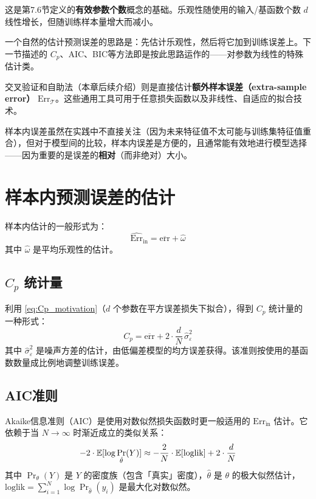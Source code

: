 这是第7.6节定义的\textbf{有效参数个数}概念的基础。乐观性随使用的输入/基函数个数 $d$ 线性增长，但随训练样本量增大而减小。

\begin{remark}
    一个自然的估计预测误差的思路是：先估计乐观性，然后将它加到训练误差上。下一节描述的 $C_p$、AIC、BIC等方法即是按此思路运作的——对参数为线性的特殊估计类。
\end{remark}

\begin{remark}
    交叉验证和自助法（本章后续介绍）则是直接估计\textbf{额外样本误差（extra-sample error）} $\mathrm{Err}_{\mathcal{T}}$。这些通用工具可用于任意损失函数以及非线性、自适应的拟合技术。
\end{remark}

样本内误差虽然在实践中不直接关注（因为未来特征值不太可能与训练集特征值重合），但对于模型间的比较，样本内误差是方便的，且通常能有效地进行模型选择——因为重要的是误差的\textbf{相对}（而非绝对）大小。

\section{样本内预测误差的估计}

样本内估计的一般形式为：
\begin{equation}\label{eq:Err_in_hat}
    \widehat{\mathrm{Err}}_{\text{in}} = \overline{\mathrm{err}} + \hat{\omega}
\end{equation}
其中 $\hat{\omega}$ 是平均乐观性的估计。

\subsection{$C_p$ 统计量}

利用 \eqref{eq:Cp_motivation}（$d$ 个参数在平方误差损失下拟合），得到 $C_p$ 统计量的一种形式：
\begin{equation}\label{eq:Cp}
    C_p = \overline{\mathrm{err}} + 2\cdot\frac{d}{N}\,\hat{\sigma}_\varepsilon^2
\end{equation}
其中 $\hat{\sigma}_\varepsilon^2$ 是噪声方差的估计，由低偏差模型的均方误差获得。该准则按使用的基函数数量成比例地调整训练误差。

\subsection{AIC准则}

Akaike信息准则（AIC）是使用对数似然损失函数时更一般适用的 $\mathrm{Err}_{\text{in}}$ 估计。它依赖于当 $N \to \infty$ 时渐近成立的类似关系：
\begin{equation}\label{eq:AIC_relation}
    -2\cdot\mathbb{E}[\log\Pr_{\hat{\theta}}(Y)] \approx -\frac{2}{N}\cdot\mathbb{E}[\text{loglik}] + 2\cdot\frac{d}{N}
\end{equation}
其中 $\Pr_\theta(Y)$ 是 $Y$ 的密度族（包含「真实」密度），$\hat{\theta}$ 是 $\theta$ 的极大似然估计，$\text{loglik} = \sum_{i=1}^{N} \log\Pr_{\hat{\theta}}(y_i)$ 是最大化对数似然。


